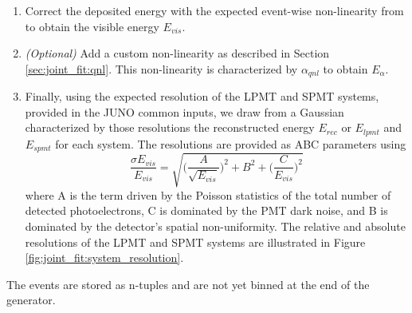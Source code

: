 \documentclass[../main.tex]{subfiles}
\begin{document}
\begin{enumerate}
  \item Correct the deposited energy with the expected event-wise non-linearity from \cite{juno_collaboration_calibration_2021} to obtain the visible energy $E_{vis}$.
  \item \textit{(Optional)} Add a custom non-linearity as described in Section \ref{sec:joint_fit:qnl}. This non-linearity is characterized by $\alpha_{qnl}$ to obtain $E_{\alpha}$.
  \item Finally, using the expected resolution of the LPMT and SPMT systems,  provided in the JUNO common inputs, we draw from a Gaussian characterized by those resolutions the reconstructed energy $E_{rec}$ or $E_{lpmt}$ and $E_{spmt}$ for each system. The resolutions are provided as ABC parameters using
    \begin{equation}
      \label{eq:joint_fit:abc}
      \frac{\sigma E_{vis}}{E_{vis}} = \sqrt{\bigg(\frac{A}{\sqrt{E_{vis}}}\bigg)^2 + B^2 + \bigg(\frac{C}{E_{vis}}\bigg)^2}
    \end{equation}
    where A is the term driven by the Poisson statistics of the total number of detected photoelectrons, C is dominated by the PMT dark noise, and B is dominated by the detector's spatial non-uniformity. The relative and absolute resolutions of the LPMT and SPMT systems are illustrated in Figure \ref{fig:joint_fit:system_resolution}.
\end{enumerate}

The events are stored as n-tuples and are not yet binned at the end of the generator.
\end{document}
